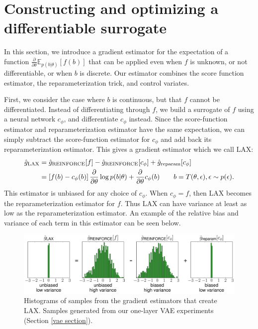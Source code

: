 \documentclass{article}
\newcommand{\E}{\mathbb{E}}
\newcommand{\PT}{\frac{\partial}{\partial \theta}}
\newcommand{\LAX}{{\textnormal{LAX}}}
\begin{document}
\section{Constructing and optimizing a differentiable surrogate}
\label{lax section}
In this section, we introduce a gradient estimator for the expectation of a function $\PT \E_{p(b|\theta)}[f(b)]$ that can be applied even when $f$ is unknown, or not differentiable, or when $b$ is discrete.
Our estimator combines the score function estimator, the reparameterization trick, and control variates.

First, we consider the case where $b$ is continuous, but that $f$ cannot be differentiated.
Instead of differentiating through $f$, we build a surrogate of $f$ using a neural network $c_\phi$, and differentiate $c_\phi$ instead.
Since the score-function estimator and reparameterization estimator have the same expectation,
we can simply subtract the score-function estimator for $c_\phi$ and add back its reparameterization estimator.
This gives a gradient estimator which we call LAX:
%
\begin{align}
\label{eq:cont_est}
\hat g_\LAX &= 
\hat{g}_\textnormal{REINFORCE}[f] - \hat{g}_\textnormal{REINFORCE}[c_\phi] + \hat{g}_\textnormal{reparam}[c_\phi] \nonumber\\
&= \left[ f(b) -c_\phi(b) \right] \PT \log p(b|\theta) + \PT c_\phi(b) \qquad b = T(\theta, \epsilon), \epsilon \sim p(\epsilon).
\end{align}
%
This estimator is unbiased for any choice of $c_\phi$.
When $c_\phi = f$, then \LAX{} becomes the reparameterization estimator for $f$.
Thus \LAX{} can have variance at least as low as the reparameterization estimator. An example of the relative bias and variance of each term in this estimator can be seen below.%
\begin{figure}[h!]
\includegraphics[width=\columnwidth]{figures/grad_hist.pdf}
\caption{Histograms of samples from the gradient estimators that create LAX. Samples generated from our one-layer VAE experiments (Section \ref{vae section}).}
\label{fig:grad hist}
\end{figure}
\end{document}
